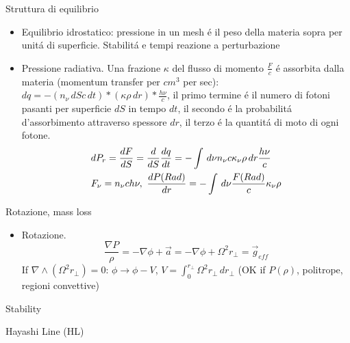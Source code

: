 \frameinlbftrue
\begin{frame}[fragile]{Struttura di equilibrio}

\begin{itemize}
\item Equilibrio idrostatico: pressione in un mesh \'e il peso della materia sopra per unit\'a di superficie. Stabilit\'a e tempi reazione a perturbazione
\item Pressione radiativa. Una frazione $\kappa$ del flusso di momento $\frac{F}{c}$ \'e assorbita dalla materia (momentum transfer per $cm^3$ per sec): $dq=-(n_{\nu}\,dSc\,dt)*(\kappa\rho\,dr)*\frac{h\nu}{c}$, il primo termine \'e il numero di fotoni pasanti per superficie $dS$ in tempo $dt$, il secondo \'e la probabilit\'a d'assorbimento attraverso spessore $dr$, il terzo \'e la quantit\'a di moto di ogni fotone.
\begin{align*}
&dP_r=\TDy{S}{F}=\TDof{S}\TDy{t}{q}=-\int \,d\nu n_{\nu}c\kappa_{\nu}\rho\,dr\frac{h\nu}{c}\\
&F_{\nu}=n_{\nu}ch\nu,\ \TDy{r}{P(Rad)}=-\int\,d\nu\frac{F(Rad)}{c}\kappa_{\nu}\rho
\end{align*}
\begin{comment}
Un elemento di volume $dS\,dr$ subisce per effetto dell'assorbimento della radiazione una variazione d'impulso $dq$, nel caso un fotone venga assorbito la variazione del flusso uscente \'e $dF<0$
The distribution of photons over over different quantum states with energies $\epsilon_k=\hbar\omega_k$ (large volume $\omega_k\to\omega$) 
\begin{align*}
\overline{n_k}=\frac{1}{\exp{\frac{\hbar\omega}{KT}}-1}
\end{align*}
Moltiplicando il numero di stati nel dato range di frequenze per la distribuzione di Plank (numero di occupazione) ottengo il numero di fotoni e l'energia radiativa nel range di frequenza
\begin{align*}
&dN_{\omega}=\frac{V}{\pi^2c^3}\frac{\omega^2\,d\omega}{\exp{\frac{\hbar\omega}{KT}}-1}\\
&dE_{\omega}=\frac{V\hbar}{\pi^2c^3}\frac{\omega^3\,d\omega}{\exp{\frac{\hbar\omega}{KT}}-1}
\end{align*}
\end{comment}
\end{itemize}

\end{frame}
\frameinlbffalse

\begin{frame}{Rotazione, mass loss}
\begin{itemize}
\item Rotazione. \[\frac{\nabla P}{\rho}=-\nabla\phi+\vec{a}=-\nabla\phi+\Omega^2r_{\perp}=\vec{g}_{eff}\]
If $\nabla\wedge(\Omega^2r_{\perp})=0$: $\phi\to\phi-V$, $V=\int_0^{r_{\perp}}\Omega^2r_{\perp}\,dr_{\perp}$ (OK if $P(\rho)$, politrope, regioni convettive)
\end{itemize}
\end{frame}

\begin{frame}{Stability}

\end{frame}

\begin{frame}{Hayashi Line (HL)}

\end{frame}
